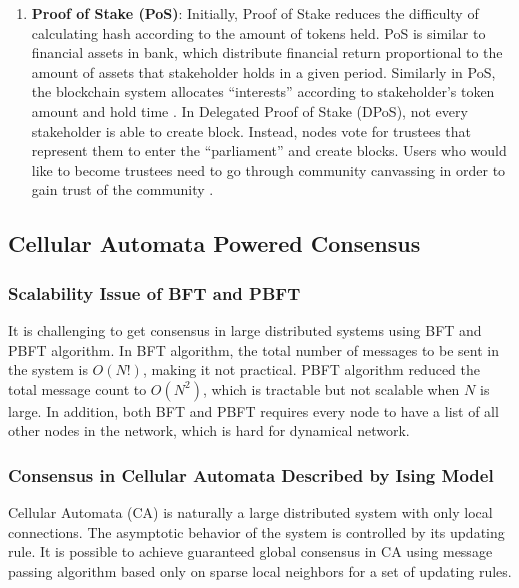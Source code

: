 \documentclass[reprint,pre,aps]{revtex4-1}
\begin{document}
\begin{enumerate}
\item \textbf{Proof of Stake (PoS)}: Initially, Proof of Stake reduces the difficulty of calculating hash according to the amount of tokens held. PoS is similar to financial assets in bank, which distribute financial return proportional to the amount of assets that stakeholder holds in a given period. Similarly in PoS, the blockchain system allocates ``interests'' according to stakeholder's token amount and hold time \cite{vasin2014blackcoin, king2012ppcoin}. In Delegated Proof of Stake (DPoS), not every stakeholder is able to create block. Instead, nodes vote for trustees that represent them to enter the “parliament” and create blocks. Users who would like to become trustees need to go through community canvassing in order to gain trust of the community \cite{dpos}.
\end{enumerate}

\subsection{Cellular Automata Powered Consensus}

\subsubsection{Scalability Issue of BFT and PBFT}

It is challenging to get consensus in large distributed systems using BFT and PBFT algorithm. In BFT algorithm, the total number of messages to be sent in the system is $O(N!)$\cite{lamport1982byzantine}, making it not practical. PBFT algorithm reduced the total message count to $O(N^2)$\cite{castro2002practical}, which is tractable but not scalable when $N$ is large. In addition, both BFT and PBFT requires every node to have a list of all other nodes in the network, which is hard for dynamical network.

\subsubsection{Consensus in Cellular Automata Described by Ising Model}

Cellular Automata (CA) is naturally a large distributed system with only local connections. The asymptotic behavior of the system is controlled by its updating rule. It is possible to achieve guaranteed global consensus in CA using message passing algorithm based only on sparse local neighbors for a set of updating rules. 
\end{document}
